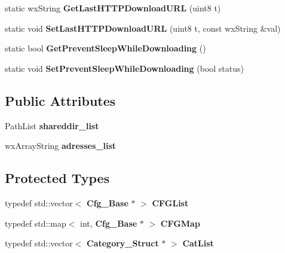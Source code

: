 \begin{DoxyCompactItemize}
\item 
static wxString {\bfseries GetLastHTTPDownloadURL} (uint8 t)\label{classCPreferences_aebff389c0a3676442c007cf0f1fa289a}

\item 
static void {\bfseries SetLastHTTPDownloadURL} (uint8 t, const wxString \&val)\label{classCPreferences_a5921ef19eaef919ec2ba96ab477ce0bb}

\item 
static bool {\bfseries GetPreventSleepWhileDownloading} ()\label{classCPreferences_a69ad4e4a539ee930d948f7f6354b6d2a}

\item 
static void {\bfseries SetPreventSleepWhileDownloading} (bool status)\label{classCPreferences_aefe8a5a5f80c20d1d6e5cacf7ffd2b1b}

\end{DoxyCompactItemize}
\subsection*{Public Attributes}
\begin{DoxyCompactItemize}
\item 
PathList {\bfseries shareddir\_\-list}\label{classCPreferences_a106260f9a1af38df43779ee160124e23}

\item 
wxArrayString {\bfseries adresses\_\-list}\label{classCPreferences_aa2e34308bff4d5b0ecc68efddacf8cd2}

\end{DoxyCompactItemize}
\subsection*{Protected Types}
\begin{DoxyCompactItemize}
\item 
typedef std::vector$<$ {\bf Cfg\_\-Base} $\ast$ $>$ {\bfseries CFGList}\label{classCPreferences_a12ca41a944f051a570cd0b063084a6b4}

\item 
typedef std::map$<$ int, {\bf Cfg\_\-Base} $\ast$ $>$ {\bfseries CFGMap}\label{classCPreferences_aaefdad460fd998a9e2fde1daf912b3ca}

\item 
typedef std::vector$<$ {\bf Category\_\-Struct} $\ast$ $>$ {\bfseries CatList}\label{classCPreferences_a135e53c7e7c758189674870c2a2fdcf2}

\end{DoxyCompactItemize}
